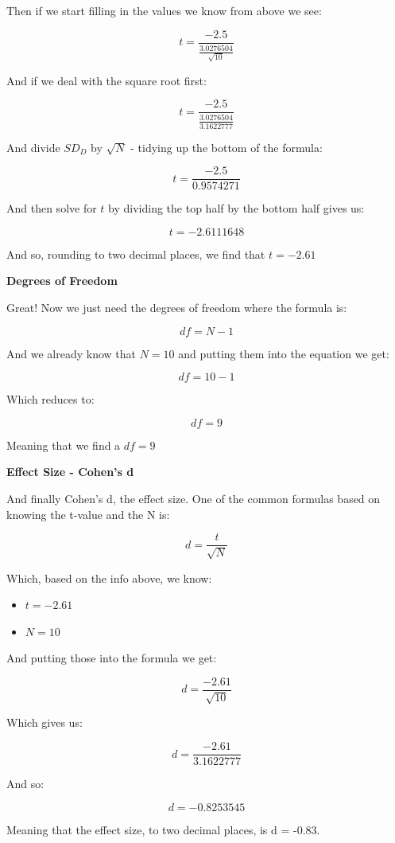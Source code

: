 \documentclass[
  oneside]{book}
\providecommand{\tightlist}{%
  \setlength{\itemsep}{0pt}\setlength{\parskip}{0pt}}
\begin{document}
Then if we start filling in the values we know from above we see:

\[t = \frac{-2.5}{\frac{3.0276504}{\sqrt{10}}} \]

And if we deal with the square root first:

\[t = \frac{-2.5}{\frac{3.0276504}{3.1622777}} \]

And divide \(SD_{D}\) by \(\sqrt{N}\) - tidying up the bottom of the formula:

\[t = \frac{-2.5}{0.9574271} \]

And then solve for \(t\) by dividing the top half by the bottom half gives us:

\[t = -2.6111648 \]

And so, rounding to two decimal places, we find that \(t = -2.61\)

\textbf{Degrees of Freedom}

Great! Now we just need the degrees of freedom where the formula is:

\[df = N - 1\]

And we already know that \(N= 10\) and putting them into the equation we get:

\[df = 10 - 1\]

Which reduces to:

\[df = 9\]

Meaning that we find a \(df = 9\)

\textbf{Effect Size - Cohen's d}

And finally Cohen's d, the effect size. One of the common formulas based on knowing the t-value and the N is:

\[d = \frac{t}{\sqrt{N}}\]

Which, based on the info above, we know:

\begin{itemize}
\tightlist
\item
  \(t = -2.61\)
\item
  \(N = 10\)
\end{itemize}

And putting those into the formula we get:

\[d = \frac{-2.61}{\sqrt{10}}\]

Which gives us:

\[d = \frac{-2.61}{3.1622777}\]

And so:

\[d = -0.8253545\]

Meaning that the effect size, to two decimal places, is d = -0.83.
\end{document}
